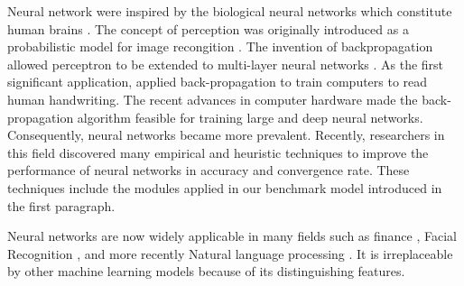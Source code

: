 Neural network were inspired by the biological neural networks which constitute human brains \citep{10.2307/4299364}.
The concept of perception was originally introduced as a probabilistic model for image recongition \citep{rosenblatt}.
The invention of backpropagation allowed perceptron to be extended to multi-layer neural networks \citep{58337}.
As the first significant application, \citet{NIPS1989293} applied back-propagation to train computers to read human handwriting. 
The recent advances in computer hardware made the back-propagation algorithm feasible for training large and deep neural networks. 
Consequently, neural networks became more prevalent. 
Recently, researchers in this field discovered many empirical and heuristic techniques to improve the performance of neural networks in accuracy and convergence rate. These techniques include the modules applied in our benchmark model introduced in the first paragraph.



Neural networks are now widely applicable in many fields such as finance \citep{Azoff:1994:NNT:561452,KAASTRA1996215}, Facial Recognition \citep{554195,655647}, and more recently Natural language processing \citep{Collobert:2008:UAN:1390156.1390177,Collobert:2011:NLP:1953048.2078186}.  It is irreplaceable by other machine learning models because of its distinguishing features. 

